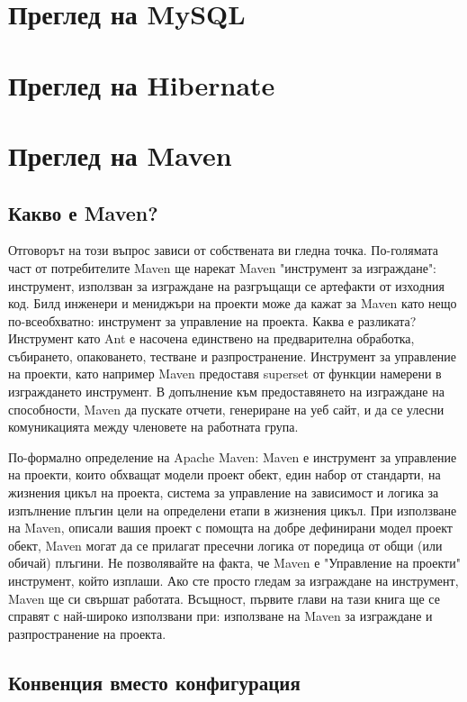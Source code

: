 \section{Преглед на MySQL}
\section{Преглед на Hibernate}
\section{Преглед на Maven}
\subsection{Какво е Maven?} 
Отговорът на този въпрос зависи от собствената ви
гледна точка. По-голямата част от потребителите Maven ще нарекат Maven
"инструмент за изграждане": инструмент, използван за изграждане на
разгръщащи се артефакти от изходния код. Билд инженери и мениджъри на
проекти може да кажат за Maven като нещо по-всеобхватно: инструмент за
управление на проекта. Каква е разликата? Инструмент като Ant е
насочена единствено на предварителна обработка, събирането,
опаковането, тестване и разпространение. Инструмент за управление на
проекти, като например Maven предоставя superset от функции намерени в
изграждането инструмент. В допълнение към предоставянето на изграждане
на способности, Maven да пускате отчети, генериране на уеб сайт, и да
се улесни комуникацията между членовете на работната група.

По-формално определение на Apache Maven: Maven е инструмент за
управление на проекти, които обхващат модели проект обект, един набор
от стандарти, на жизнения цикъл на проекта, система за управление на
зависимост и логика за изпълнение плъгин цели на определени етапи в
жизнения цикъл. При използване на Maven, описали вашия проект с
помощта на добре дефинирани модел проект обект, Maven могат да се
прилагат пресечни логика от поредица от общи (или обичай) плъгини.  Не
позволявайте на факта, че Maven е "Управление на проекти" инструмент,
който изплаши. Ако сте просто гледам за изграждане на инструмент,
Maven ще си свършат работата. Всъщност, първите глави на тази книга ще
се справят с най-широко използвани при: използване на Maven за
изграждане и разпространение на проекта.
\subsection{Конвенция вместо конфигурация}


